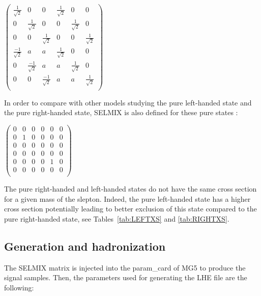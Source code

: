 \documentclass{cernatlasnote}
\begin{document}
\begin{appendices}
\begin{center}
     $\begin{pmatrix}
  \frac{1}{\sqrt{2}} & 0 & 0 & \frac{1}{\sqrt{2}} & 0 & 0 \\ 
  0 & \frac{1}{\sqrt{2}} & 0 & 0 & \frac{1}{\sqrt{2}} & 0  \\
  0 & 0 & \frac{1}{\sqrt{2}} & 0 & 0 & \frac{1}{\sqrt{2}} \\
  \frac{-1}{\sqrt{2}} & a & a & \frac{1}{\sqrt{2}} & 0 & 0  \\
  0 & \frac{-1}{\sqrt{2}} & a & a & \frac{1}{\sqrt{2}} & 0  \\
  0 & 0 & \frac{-1}{\sqrt{2}} & a & a & \frac{1}{\sqrt{2}}  \\
\end{pmatrix}$
\end{center}

In order to compare with other models studying the pure left-handed state and the pure right-handed state, SELMIX is also defined for these pure states :

\begin{center}
     $\begin{pmatrix}
  0 & 0 & 0 & 0 & 0 & 0 \\ 
  0 & 1 & 0 & 0 & 0 & 0  \\
  0 & 0 & 0 & 0 & 0 & 0  \\
  0 & 0 & 0 & 0 & 0 & 0  \\
  0 & 0 & 0 & 0 & 1 & 0  \\
  0 & 0 & 0 & 0 & 0 & 0  \\
\end{pmatrix}$
\end{center}
 The pure right-handed and left-handed states do not have the same cross section for a given mass of the slepton. Indeed, the pure left-handed state has a higher cross section potentially leading to better exclusion of this state compared to the pure right-handed state, see Tables~\ref{tab:LEFTXS} and \ref{tab:RIGHTXS}. 

\subsection{Generation and hadronization}
The SELMIX matrix is injected into the param\_card of MG5 to produce the signal samples.
Then, the parameters used for generating the LHE file are the following:


\end{appendices}
\end{document}
